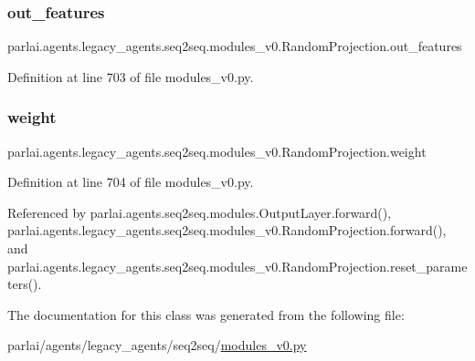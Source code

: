 \subsubsection{\texorpdfstring{out\+\_\+features}{out\_features}}
{\footnotesize\ttfamily parlai.\+agents.\+legacy\+\_\+agents.\+seq2seq.\+modules\+\_\+v0.\+Random\+Projection.\+out\+\_\+features}



Definition at line 703 of file modules\+\_\+v0.\+py.

\mbox{\label{classparlai_1_1agents_1_1legacy__agents_1_1seq2seq_1_1modules__v0_1_1RandomProjection_a6564c7d7b6296013fc59706c0c32267e}} 
\subsubsection{\texorpdfstring{weight}{weight}}
{\footnotesize\ttfamily parlai.\+agents.\+legacy\+\_\+agents.\+seq2seq.\+modules\+\_\+v0.\+Random\+Projection.\+weight}



Definition at line 704 of file modules\+\_\+v0.\+py.



Referenced by parlai.\+agents.\+seq2seq.\+modules.\+Output\+Layer.\+forward(), parlai.\+agents.\+legacy\+\_\+agents.\+seq2seq.\+modules\+\_\+v0.\+Random\+Projection.\+forward(), and parlai.\+agents.\+legacy\+\_\+agents.\+seq2seq.\+modules\+\_\+v0.\+Random\+Projection.\+reset\+\_\+parameters().



The documentation for this class was generated from the following file\+:\begin{DoxyCompactItemize}
\item 
parlai/agents/legacy\+\_\+agents/seq2seq/\hyperlink{seq2seq_2modules__v0_8py}{modules\+\_\+v0.\+py}\end{DoxyCompactItemize}
